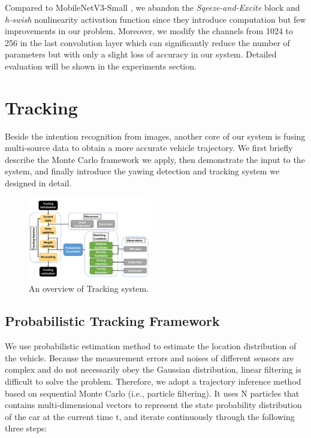 \documentclass[journal]{IEEEtran}
\begin{document}
Compared to MobileNetV3-Small \cite{mobilenetv3}, we abandon the \textit{Sqeeze-and-Excite} \cite{hu2018squeeze} block and \textit{h-swish} nonlinearity activation function since they introduce computation but few improvements in our problem.  
Moreover, we modify the channels from 1024 to 256 in the last convolution layer which can significantly reduce the number of parameters but with only a slight loss of accuracy in our system. Detailed evaluation will be shown in the experiments section.

\section{Tracking}\label{sec:tracking}
Beside the intention recognition from images, another core of our system is fusing multi-source data\cite{hostettler2014vehicle} to obtain a more accurate vehicle trajectory. We first briefly describe the Monte Carlo framework we apply, then demonstrate the input to the system, and finally introduce the yawing detection and tracking system we designed in detail.

\begin{figure}[htbp]
    \centerline{\includegraphics[width=0.48\textwidth]{fig/PF-Systemoverall.pdf}}
    \caption{An overview of Tracking system.}
    \label{fig:track_system}
\end{figure}

\subsection{Probabilistic Tracking Framework}
 We use probabilistic estimation method to estimate the location distribution of the vehicle. Because the measurement errors and noises of different sensors are complex and do not necessarily obey the Gaussian distribution, linear filtering is difficult to solve the problem. Therefore, we adopt a trajectory inference method based on sequential Monte Carlo (i.e., particle filtering). It uses N particles that contains multi-dimensional vectors to represent the state probability distribution of the car at the current time t, and iterate continuously through the following three steps\cite{du2019enhanced}:
\end{document}
